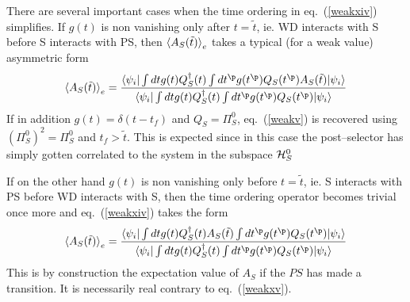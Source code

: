 \documentclass[12pt]{article}
\begin{document}
There are
several important cases when the time ordering in eq.~(\ref{weakxiv})
simplifies.
If $g(t)$ is non vanishing only after $t=\tilde t$, ie. WD interacts with S
before S interacts with PS, then $\mbox{$ \langle A_{S}(\tilde t) \rangle $}_{e}$  takes a
typical (for a weak value) asymmetric form
\begin{equation}
 \bk{A_{S}(\tilde t)}_{e} =  {
\bi \int dt g(t) Q_S^\dagger (t)
 \int dt^\p g(t^\p) Q_S(t^\p)  A_S(\tilde t) \ki \over \bi \int dt g(t)
Q_S^\dagger
(t) \int dt^\p g(t^\p) Q_S(t^\p) \ki} \label{weakxv} \end{equation}
If in addition $g(t)=\delta(t-t_f)$
and $Q_S=\Pi_S^0$,
eq.~(\ref{weakv}) is recovered using $ (\Pi_S^0)^2 = \Pi_S^0$ and
$t_f >\tilde t$. This
is expected since in this case the post--selector has simply gotten
correlated to the system in the subspace ${\cal H}^0_S$

If on the other hand $g(t)$ is non vanishing only before $t=\tilde t$, ie. S
interacts with PS before WD interacts with S, then the time
ordering operator becomes trivial once more and eq.~(\ref{weakxiv}) takes the
form \begin{equation}
\bk{A_{S}(\tilde t)}_{e} =  { \bi \int dt g(t)
Q_S^\dagger (t) A_S(\tilde t)
 \int dt^\p g(t^\p) Q_S(t^\p)   \ki \over \bi \int dt g(t) Q_S^\dagger (t)
\int dt^\p g(t^\p) Q_S(t^\p) \ki} \label{weakxvi}
\end{equation}
This is by construction the
 expectation value of $A_S$ if the $PS$ has made a transition.
It is
necessarily real contrary to  eq.~(\ref{weakxv}).
\end{document}
